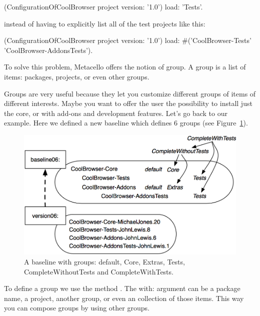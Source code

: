 \documentclass[a4paper,10pt,twoside]{book}
\begin{document}
\begin{code}{}
(ConfigurationOfCoolBrowser project version: '1.0') load: 'Tests'.
\end{code}

instead of having to explicitly list all of the test projects like this:
 
\begin{code}{} 
(ConfigurationOfCoolBrowser project version: '1.0') 
	load: #('CoolBrowser-Tests' 'CoolBrowser-AddonsTests').
\end{code}
 
To solve this problem, Metacello offers the notion of group. A group is a list of items: packages, projects, or even other groups. 
 
Groups are very useful because they let you customize different groups of items of different interests. Maybe you want to offer the  user the possibility to install just the core, or with add-ons and development features. Let's go back to our example. Here we defined a new baseline  which defines 6 groups (see Figure~\ref{fig:version06}). 

\begin{figure}
\begin{center}
\includegraphics[width=0.6\linewidth]{version06}
\caption{A baseline with groups: default, Core, Extras, Tests, CompleteWithoutTests and CompleteWithTests.\label{fig:version06}}
\end{center}
\end{figure} 


To define a group we use the method . The {with:} argument can be a package name, a project, another group, or even an collection of those items. This way you can compose groups by using other groups. 
 
\end{document}
